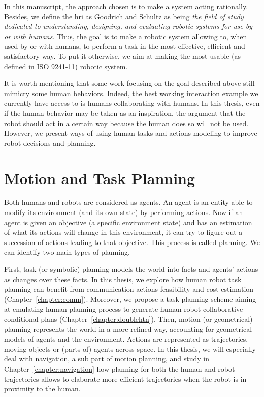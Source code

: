 \documentclass[a4paper,11pt,twoside]{StyleThese}
\begin{document}
In this manuscript, the approach chosen is to make a system acting rationally. Besides, we define the \acrfull{hri} as Goodrich and Schultz as being \textit{the field of study dedicated to understanding, designing, and evaluating robotic systems for use by or with humans}. Thus, the goal is to make a robotic system allowing to, when used by or with humans, to perform a task in the most effective, efficient and satisfactory way. To put it otherwise, we aim at making the most usable (as defined in ISO 9241-11) robotic system.

It is worth mentioning that some work focusing on the goal described above still mimicry some human behaviors. Indeed, the best working interaction example we currently have access to is humans collaborating with humans. In this thesis, even if the human behavior may be taken as an inspiration, the argument that the robot should act in a certain way because the human does so will not be used. However, we present ways of using human tasks and actions modeling to improve robot decisions and planning.



\section*{Motion and Task Planning}
Both humans and robots are considered as agents. An agent is an entity able to modify its environment (and its own state) by performing actions. Now if an agent is given an objective (a specific environment state) and has an estimation of what its actions will change in this environment, it can try to figure out a succession of actions leading to that objective. This process is called planning. We can identify two main types of planning. 

First, task (or symbolic) planning models the world into facts and agents' actions as changes over these facts. In this thesis, we explore how human robot task planning can benefit from communication actions feasibility and cost estimation (Chapter~\ref{chapter:comm}). Moreover, we propose a task planning scheme aiming at emulating human planning process to generate human robot collaborative conditional plans (Chapter~\ref{chapter:doublehtn}). Then, motion (or geometrical) planning represents the world in a more refined way, accounting for geometrical models of agents and the environment. Actions are represented as trajectories, moving objects or (parts of) agents across space. In this thesis, we will especially deal with navigation, a sub part of motion planning, and study in Chapter~\ref{chapter:navigation} how planning for both the human and robot trajectories allows to elaborate more efficient trajectories when the robot is in proximity to the human.
\end{document}
